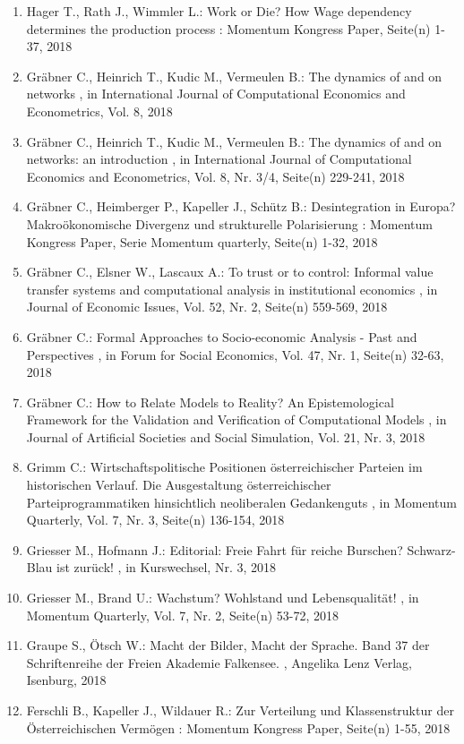 \begin{enumerate}[leftmargin=*, labelsep=0.5cm]
	 \item Hager T., Rath J., Wimmler L.:  Work or Die? How Wage dependency determines the production process  : Momentum Kongress Paper, Seite(n) 1-37, 2018
	 \item Gräbner C., Heinrich T., Kudic M., Vermeulen B.:  The dynamics of and on networks  , in International Journal of Computational Economics and Econometrics, Vol. 8, 2018
	 \item Gräbner C., Heinrich T., Kudic M., Vermeulen B.:  The dynamics of and on networks: an introduction  , in International Journal of Computational Economics and Econometrics, Vol. 8, Nr. 3/4, Seite(n) 229-241, 2018
	 \item Gräbner C., Heimberger P., Kapeller J., Schütz B.:  Desintegration in Europa? Makroökonomische Divergenz und strukturelle Polarisierung  : Momentum Kongress Paper, Serie Momentum quarterly, Seite(n) 1-32, 2018
	 \item Gräbner C., Elsner W., Lascaux A.:  To trust or to control: Informal value transfer systems and computational analysis in institutional economics  , in Journal of Economic Issues, Vol. 52, Nr. 2, Seite(n) 559-569, 2018
	 \item Gräbner C.:  Formal Approaches to Socio-economic Analysis - Past and Perspectives  , in Forum for Social Economics, Vol. 47, Nr. 1, Seite(n) 32-63, 2018
	 \item Gräbner C.:  How to Relate Models to Reality? An Epistemological Framework for the Validation and Verification of Computational Models  , in Journal of Artificial Societies and Social Simulation, Vol. 21, Nr. 3, 2018
	 \item Grimm C.:  Wirtschaftspolitische Positionen österreichischer Parteien im historischen Verlauf. Die Ausgestaltung österreichischer Parteiprogrammatiken hinsichtlich neoliberalen Gedankenguts  , in Momentum Quarterly, Vol. 7, Nr. 3, Seite(n) 136-154, 2018
	 \item Griesser M., Hofmann J.:  Editorial: Freie Fahrt für reiche Burschen? Schwarz-Blau ist zurück!  , in Kurswechsel, Nr. 3, 2018
	 \item Griesser M., Brand U.:  Wachstum? Wohlstand und Lebensqualität!  , in Momentum Quarterly, Vol. 7, Nr. 2, Seite(n) 53-72, 2018
	 \item Graupe S., Ötsch W.:  Macht der Bilder, Macht der Sprache. Band 37 der Schriftenreihe der Freien Akademie Falkensee.  , Angelika Lenz Verlag, Isenburg, 2018
	 \item Ferschli B., Kapeller J., Wildauer R.:  Zur Verteilung und Klassenstruktur der Österreichischen Vermögen  : Momentum Kongress Paper, Seite(n) 1-55, 2018

\end{enumerate}

